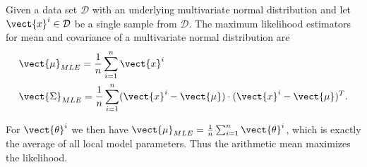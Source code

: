 \begin{tcolorbox}
    Given a data set $\mathcal{D}$ with an underlying multivariate normal distribution and let $\vect{x}^i \in \mathcal{D}$ be a single sample from $\mathcal{D}$.
    The maximum likelihood estimators for mean and covariance of a multivariate normal distribution are
    \begin{equation}
        \begin{split}
            &\vect{\mu}_{MLE} = \frac{1}{n} \sum_{i=1}^n \vect{x}^i \\
        &\vect{\Sigma}_{MLE} = \frac{1}{n} \sum_{i=1}^n (\vect{x}^i - \vect{\mu}) \cdot  (\vect{x}^i - \vect{\mu})^T.
        \end{split}
    \end{equation}
\end{tcolorbox}
For $\vect{\theta}^i$ we then have $\vect{\mu}_{MLE} = \frac{1}{n} \sum_{i=1}^n \vect{\theta}^i$, which is exactly the average of all local model parameters.
Thus the arithmetic mean maximizes the likelihood.
